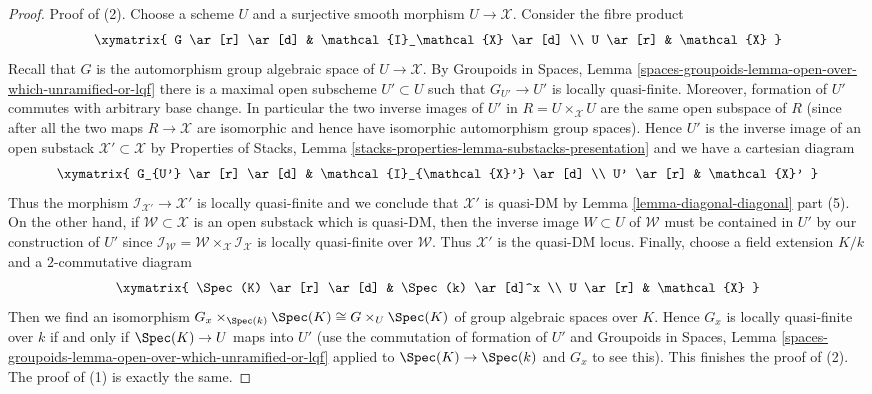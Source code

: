 \begin{proof}
Proof of (2). Choose a scheme $U$ and a surjective smooth morphism
$U \to \mathcal{X}$. Consider the fibre product
$$
\xymatrix{
G \ar[r] \ar[d] & \mathcal{I}_\mathcal{X} \ar[d] \\
U \ar[r] & \mathcal{X}
}
$$
Recall that $G$ is the automorphism group algebraic space of
$U \to \mathcal{X}$. By Groupoids in Spaces, Lemma
\ref{spaces-groupoids-lemma-open-over-which-unramified-or-lqf}
there is a maximal open subscheme $U' \subset U$
such that $G_{U'} \to U'$ is locally quasi-finite.
Moreover, formation of $U'$ commutes with arbitrary
base change. In particular the two inverse images of $U'$
in $R = U \times_\mathcal{X} U$ are the same open subspace of $R$
(since after all the two maps $R \to \mathcal{X}$ are isomorphic
and hence have isomorphic automorphism group spaces).
Hence $U'$ is the inverse image of an open substack
$\mathcal{X}' \subset \mathcal{X}$ by
Properties of Stacks, Lemma
\ref{stacks-properties-lemma-substacks-presentation}
and we have a cartesian diagram
$$
\xymatrix{
G_{U'} \ar[r] \ar[d] & \mathcal{I}_{\mathcal{X}'} \ar[d] \\
U' \ar[r] & \mathcal{X}'
}
$$
Thus the morphism $\mathcal{I}_{\mathcal{X}'} \to \mathcal{X}'$
is locally quasi-finite and we conclude that
$\mathcal{X}'$ is quasi-DM by Lemma \ref{lemma-diagonal-diagonal}
part (5). On the other hand, if $\mathcal{W} \subset \mathcal{X}$
is an open substack which is quasi-DM, then the inverse image
$W \subset U$ of $\mathcal{W}$ must be contained in $U'$ by our
construction of $U'$ since
$\mathcal{I}_\mathcal{W} =
\mathcal{W} \times_\mathcal{X} \mathcal{I}_\mathcal{X}$
is locally quasi-finite over $\mathcal{W}$.
Thus $\mathcal{X}'$ is the quasi-DM locus.
Finally, choose a field extension $K/k$ and a $2$-commutative
diagram
$$
\xymatrix{
\Spec(K) \ar[r] \ar[d] & \Spec(k) \ar[d]^x \\
U \ar[r] & \mathcal{X}
}
$$
Then we find an isomorphism
$G_x \times_{\Spec(k)} \Spec(K) \cong G \times_U \Spec(K)$
of group algebraic spaces over $K$. Hence $G_x$ is locally quasi-finite
over $k$ if and only if $\Spec(K) \to U$ maps into $U'$
(use the commutation of formation of $U'$ and
Groupoids in Spaces, Lemma
\ref{spaces-groupoids-lemma-open-over-which-unramified-or-lqf}
applied to $\Spec(K) \to \Spec(k)$ and $G_x$ to see this).
This finishes the proof of (2). The proof of (1) is
exactly the same.
\end{proof}










